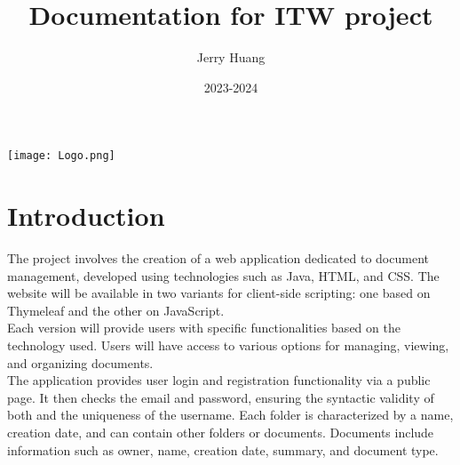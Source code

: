 \documentclass[a4paper,12pt]{article}
\title{Documentation for ITW project}
\author{Jerry Huang}
\date{2023-2024}
\begin{document}
\maketitle
\begin{center}
\texttt{[image: Logo.png]}
\end{center}
\newpage
\tableofcontents
\newpage


\section{Introduction}

The project involves the creation of a web application dedicated to document management, developed using technologies such as Java, HTML, and CSS. The website will be available in two variants for client-side scripting: one based on Thymeleaf and the other on JavaScript.\\ Each version will provide users with specific functionalities based on the technology used. Users will have access to various options for managing, viewing, and organizing documents.\\ The application provides user login and registration functionality via a public page. It then checks the email and password, ensuring the syntactic validity of both and the uniqueness of the username. Each folder is characterized by a name, creation date, and can contain other folders or documents. Documents include information such as owner, name, creation date, summary, and document type. 
\end{document}
